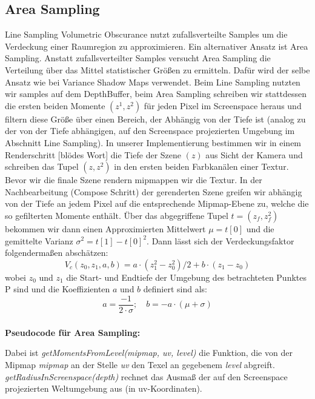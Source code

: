 \documentclass[runningheaders,a4paper]{llncs}
\begin{document}
\subsection{Area Sampling}
Line Sampling Volumetric Obscurance nutzt zufallsverteilte Samples um die Verdeckung einer
Raumregion zu approximieren. Ein alternativer Ansatz ist Area Sampling. Anstatt zufallsverteilter Samples
versucht Area Sampling die Verteilung über das Mittel statistischer Größen zu ermitteln. Dafür
wird der selbe Ansatz wie bei Variance Shadow Maps \cite{vsmPaper} verwendet. Beim Line Sampling
nutzten wir samples auf dem DepthBuffer, beim Area Sampling schreiben wir stattdessen die ersten beiden
Momente $(z^1, z^2)$ für jeden Pixel im Screenspace heraus und filtern diese Größe über einen Bereich, der
Abhängig von der Tiefe ist (analog zu der von der Tiefe abhängigen, auf den Screenspace projezierten Umgebung
im Abschnitt Line Sampling). In unserer Implementierung bestimmen wir in einem Renderschritt [blödes Wort]
die Tiefe der Szene $(z)$ aus Sicht der Kamera und schreiben das Tupel $(z, z^2)$ in den ersten beiden
Farbkanälen einer Textur. Bevor wir die finale Szene rendern mipmappen wir die Textur.
In der Nachbearbeitung (Compose Schritt) der gerenderten Szene greifen wir abhängig von der Tiefe an jedem
Pixel auf die entsprechende Mipmap-Ebene zu, welche die so gefilterten Momente enthält.
Über das abgegriffene Tupel $t = (z_f, z_f^2)$ bekommen wir dann einen Approximierten Mittelwert 
$\mu = t[0]$ und die gemittelte Varianz $\sigma^2 = t[1] - t[0]^2$. Dann lässt sich der Verdeckungsfaktor 
folgendermaßen abschätzen:
$$
V_c(z_0, z_1, a, b) = a\cdot(z_1^2 - z_0^2) / 2 + b \cdot (z_1 - z_0)
$$
wobei $z_0$ und $z_1$ die Start- und Endtiefe der Umgebung des betrachteten Punktes P sind und die 
Koeffizienten $a$ und $b$ definiert sind als:
$$
a = \frac{-1}{2 \cdot \sigma}; \quad b = -a \cdot (\mu + \sigma)
$$

\subsubsection{} \textbf{Pseudocode für Area Sampling:} \\
\begin{algorithm}[H]
\end{algorithm}
Dabei ist \textit{getMomentsFromLevel(mipmap, uv, level)} die Funktion, die von der Mipmap \textit{mipmap}
an der Stelle \textit{uv} den Texel an gegebenem \textit{level} abgreift.
\textit{getRadiusInScreenspace(depth)} rechnet das Ausmaß der auf den Screenspace projezierten Weltumgebung
aus (in uv-Koordinaten).
\end{document}
